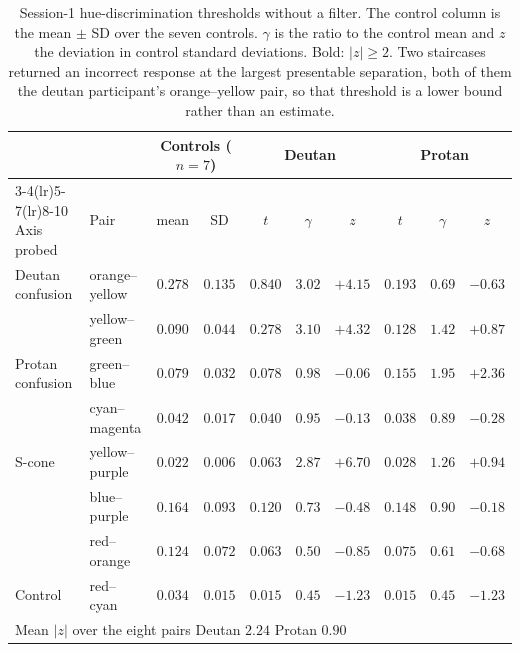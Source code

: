 \begin{table}[h]
\centering
\caption{Session-1 hue-discrimination thresholds without a filter. The control column is the mean $\pm$ SD over the seven controls. $\gamma$ is the ratio to the control mean and $z$ the deviation in control standard deviations. Bold: $|z| \geq 2$. Two staircases returned an incorrect response at the largest presentable separation, both of them the deutan participant's orange--yellow pair, so that threshold is a lower bound rather than an estimate.}
\label{tab:jnd_baseline}
\setlength{\tabcolsep}{4pt}
\begin{tabular}{llcccccccc}
\toprule
& & \multicolumn{2}{c}{Controls ($n = 7$)} & \multicolumn{3}{c}{Deutan} & \multicolumn{3}{c}{Protan} \\
\cmidrule(lr){3-4}\cmidrule(lr){5-7}\cmidrule(lr){8-10}
Axis probed & Pair & mean & SD & $t$ & $\gamma$ & $z$ & $t$ & $\gamma$ & $z$ \\
\midrule
Deutan confusion & orange--yellow & $0.278$ & $0.135$ & $0.840$ & $\mathbf{3.02}$ & $\mathbf{+4.15}$ & $0.193$ & $0.69$ & $-0.63$ \\
                 & yellow--green  & $0.090$ & $0.044$ & $0.278$ & $\mathbf{3.10}$ & $\mathbf{+4.32}$ & $0.128$ & $1.42$ & $+0.87$ \\
\midrule
Protan confusion & green--blue    & $0.079$ & $0.032$ & $0.078$ & $0.98$ & $-0.06$ & $0.155$ & $\mathbf{1.95}$ & $\mathbf{+2.36}$ \\
                 & cyan--magenta  & $0.042$ & $0.017$ & $0.040$ & $0.95$ & $-0.13$ & $0.038$ & $0.89$ & $-0.28$ \\
\midrule
S-cone           & yellow--purple & $0.022$ & $0.006$ & $0.063$ & $\mathbf{2.87}$ & $\mathbf{+6.70}$ & $0.028$ & $1.26$ & $+0.94$ \\
                 & blue--purple   & $0.164$ & $0.093$ & $0.120$ & $0.73$ & $-0.48$ & $0.148$ & $0.90$ & $-0.18$ \\
                 & red--orange    & $0.124$ & $0.072$ & $0.063$ & $0.50$ & $-0.85$ & $0.075$ & $0.61$ & $-0.68$ \\
\midrule
Control          & red--cyan      & $0.034$ & $0.015$ & $0.015$ & $0.45$ & $-1.23$ & $0.015$ & $0.45$ & $-1.23$ \\
\midrule
\multicolumn{7}{l}{Mean $|z|$ over the eight pairs \quad Deutan $2.24$ \quad Protan $0.90$} & & & \\
\bottomrule
\end{tabular}
\end{table}


